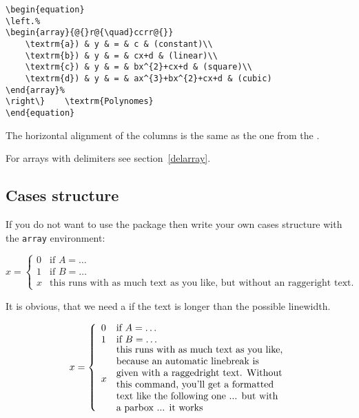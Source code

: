 \begin{lstlisting}
\begin{equation}
\left.%
\begin{array}{@{}r@{\quad}ccrr@{}}
	\textrm{a}) & y & = & c & (constant)\\
	\textrm{b}) & y & = & cx+d & (linear)\\
	\textrm{c}) & y & = & bx^{2}+cx+d & (square)\\
	\textrm{d}) & y & = & ax^{3}+bx^{2}+cx+d & (cubic)
\end{array}%
\right\} 	\textrm{Polynomes}
\end{equation}
\end{lstlisting}


The horizontal alignment of the columns is the same as the one from the
.

For arrays with delimiters see section~\vref{delarray}.

\subsection{Cases structure}

If you do not want to use the \AmSmath package then write your own
cases structure with the \verb|array| environment:

\begin{LTXexample}[pos=b]
\begin{equation}
x=\left\{ \begin{array}{cl}
0 & \textrm{if }A=\ldots\\
1 & \textrm{if }B=\ldots\\
x & \textrm{this runs with as much text as you like, but without an raggeright text.}\end{array}\right.
\end{equation}
\end{LTXexample}


It is obvious, that we need a  if the text is longer than the possible linewidth.

\begin{LTXexample}[pos=b]
\begin{equation}
x = \left\{%
   \begin{array}{l>{\raggedright}p{.5\textwidth}}%
      0 & if $A=\ldots$\tabularnewline
      1 & if $B=\ldots$\tabularnewline
      x & \parbox{0.5\columnwidth}{this runs with as much text as you like, %
          because an automatic linebreak is given with %
          a raggedright text. Without this %
          \raggedright command, you'll get a formatted %
          text like the following one ... but with a parbox ... it works}
    \end{array}%
  \right. %
\end{equation}
\end{LTXexample}



